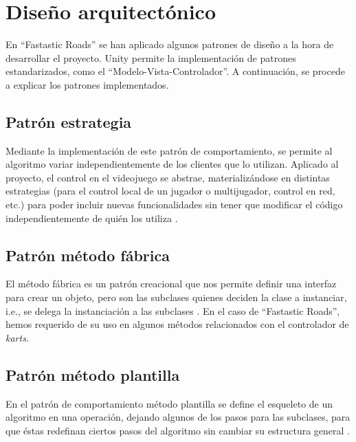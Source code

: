 \section{Diseño arquitectónico}

En ``Fastastic Roads'' se han aplicado algunos patrones de diseño a la hora de desarrollar el proyecto. Unity permite la implementación de patrones estandarizados, como el ``Modelo-Vista-Controlador''. A continuación, se procede a explicar los patrones implementados.

\subsection{Patrón estrategia}

Mediante la implementación de este patrón de comportamiento, se permite al algoritmo variar independientemente de los clientes que lo utilizan. Aplicado al proyecto, el control en el videojuego se abstrae, materializándose en distintas estrategias (para el control local de un jugador o multijugador, control en red, etc.) para poder incluir nuevas funcionalidades sin tener que modificar el código independientemente de quién los utiliza \cite{disman:estrat}.


\subsection{Patrón método fábrica}

El método fábrica es un patrón creacional que nos permite definir una interfaz para crear un objeto, pero son las subclases quienes deciden la clase a instanciar, i.e., se delega la instanciación a las subclases \cite{disman:metfab}. En el caso de ``Fastastic Roads'', hemos requerido de su uso en algunos métodos relacionados con el controlador de \textit{karts}.


\subsection{Patrón método plantilla}

En el patrón de comportamiento método plantilla se define el esqueleto de un algoritmo en una operación, dejando algunos de los pasos para las subclases, para que éstas redefinan ciertos pasos del algoritmo sin cambiar su estructura general \cite{disman:metplan}.

